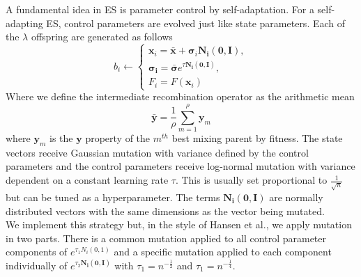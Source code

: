 A fundamental idea in ES is parameter control by self-adaptation. For a self-adapting ES, control parameters are evolved just like state parameters. Each of the $\lambda$ offspring are generated as follows
\begin{equation}
b_i \gets
\begin{cases}
    \bm{x}_i = \bar{\bm{x}} + \bm{\sigma}_i\bm{N_i(0, I)},\\
    \bm{\sigma_i} = \bar{\bm{\sigma}}e^{\tau\bm{N_i(0, I)}},\\
    F_i = F(\bm{x}_i)
\end{cases}
\end{equation}
Where we define the intermediate recombination operator as the arithmetic mean
\begin{equation}
  \bar{\bm{y}} = \frac{1}{\rho}\sum_{m=1}^{\rho}{\bm{y}_m}
\end{equation}
where $\bm{y}_m$ is the $\bm{y}$ property of the $m^{th}$ best mixing parent by fitness. The state vectors receive Gaussian mutation with variance defined by the control parameters and the control parameters receive log-normal mutation with variance dependent on a constant learning rate $\tau$. This is usually set proportional to $\frac{1}{\sqrt{n}}$ but can be tuned as a hyperparameter. The terms $\bm{N_i(0, I)}$ are normally distributed vectors with the same dimensions as the vector being mutated.\\

We implement this strategy but, in the style of Hansen et al.\cite{hansen2015evolution}, we apply mutation in two parts. There is a common mutation applied to all control parameter components of $e^{\tau_1{N_i(0, 1)}}$ and a specific mutation applied to each component individually of $e^{\tau_2\bm{N_i(0, I)}}$ with $\tau_1 = n^{-\frac{1}{2}}$ and $\tau_1 = n^{-\frac{1}{4}}$.\\




